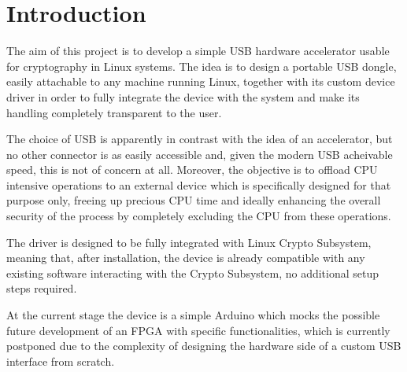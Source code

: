 \section{Introduction}
The aim of this project is to develop a simple USB hardware accelerator usable for cryptography in Linux systems. The idea is to design a portable USB dongle, easily attachable to any machine running Linux, together with its custom device driver in order to fully integrate the device with the system and make its handling completely transparent to the user.

The choice of USB is apparently in contrast with the idea of an accelerator, but no other connector is as easily accessible and, given the modern USB acheivable speed, this is not of concern at all. Moreover, the objective is to offload CPU intensive operations to an external device which is specifically designed for that purpose only, freeing up precious CPU time and ideally enhancing the overall security of the process by completely excluding the CPU from these operations.

The driver is designed to be fully integrated with Linux Crypto Subsystem, meaning that, after installation, the device is already compatible with any existing software interacting with the Crypto Subsystem, no additional setup steps required.

At the current stage the device is a simple Arduino which mocks the possible future development of an FPGA with specific functionalities, which is currently postponed due to the complexity of designing the hardware side of a custom USB interface from scratch.

